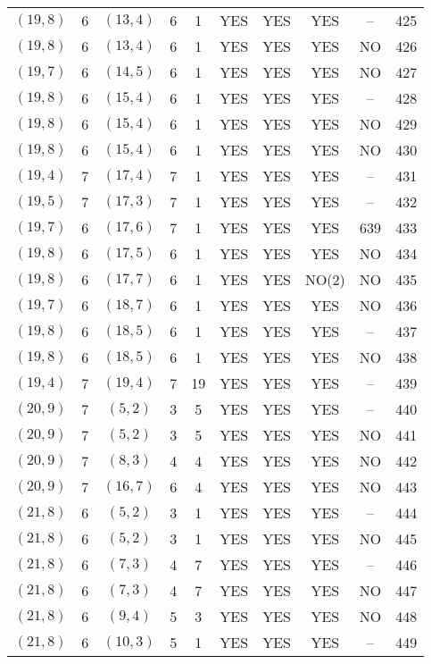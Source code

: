 \begin{longtable}{|c|c|c|c|c|c|c|c|c|c|}
$(19, 8)$ & 6 & $(13, 4)$ & 6 & 1 & YES & YES & YES & -- & 425\\
$(19, 8)$ & 6 & $(13, 4)$ & 6 & 1 & YES & YES & YES & NO & 426\\
$(19, 7)$ & 6 & $(14, 5)$ & 6 & 1 & YES & YES & YES & NO & 427\\
$(19, 8)$ & 6 & $(15, 4)$ & 6 & 1 & YES & YES & YES & -- & 428\\
$(19, 8)$ & 6 & $(15, 4)$ & 6 & 1 & YES & YES & YES & NO & 429\\
$(19, 8)$ & 6 & $(15, 4)$ & 6 & 1 & YES & YES & YES & NO & 430\\
$(19, 4)$ & 7 & $(17, 4)$ & 7 & 1 & YES & YES & YES & -- & 431\\
$(19, 5)$ & 7 & $(17, 3)$ & 7 & 1 & YES & YES & YES & -- & 432\\
$(19, 7)$ & 6 & $(17, 6)$ & 7 & 1 & YES & YES & YES & 639 & 433\\
$(19, 8)$ & 6 & $(17, 5)$ & 6 & 1 & YES & YES & YES & NO & 434\\
$(19, 8)$ & 6 & $(17, 7)$ & 6 & 1 & YES & YES & NO(2) & NO & 435\\
$(19, 7)$ & 6 & $(18, 7)$ & 6 & 1 & YES & YES & YES & NO & 436\\
$(19, 8)$ & 6 & $(18, 5)$ & 6 & 1 & YES & YES & YES & -- & 437\\
$(19, 8)$ & 6 & $(18, 5)$ & 6 & 1 & YES & YES & YES & NO & 438\\
$(19, 4)$ & 7 & $(19, 4)$ & 7 & 19 & YES & YES & YES & -- & 439\\
$(20, 9)$ & 7 & $(5, 2)$ & 3 & 5 & YES & YES & YES & -- & 440\\
$(20, 9)$ & 7 & $(5, 2)$ & 3 & 5 & YES & YES & YES & NO & 441\\
$(20, 9)$ & 7 & $(8, 3)$ & 4 & 4 & YES & YES & YES & NO & 442\\
$(20, 9)$ & 7 & $(16, 7)$ & 6 & 4 & YES & YES & YES & NO & 443\\
$(21, 8)$ & 6 & $(5, 2)$ & 3 & 1 & YES & YES & YES & -- & 444\\
$(21, 8)$ & 6 & $(5, 2)$ & 3 & 1 & YES & YES & YES & NO & 445\\
$(21, 8)$ & 6 & $(7, 3)$ & 4 & 7 & YES & YES & YES & -- & 446\\
$(21, 8)$ & 6 & $(7, 3)$ & 4 & 7 & YES & YES & YES & NO & 447\\
$(21, 8)$ & 6 & $(9, 4)$ & 5 & 3 & YES & YES & YES & NO & 448\\
$(21, 8)$ & 6 & $(10, 3)$ & 5 & 1 & YES & YES & YES & -- & 449\\

\end{longtable}
